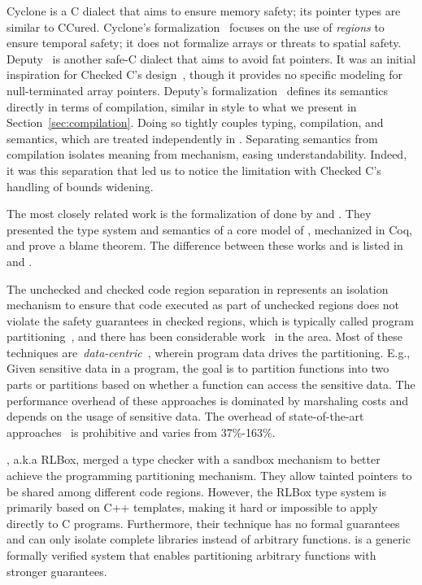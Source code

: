 Cyclone \cite{Jim2002,GrossmanMJHWC02} is a C dialect that aims to
ensure memory safety; its pointer types are similar to
CCured. Cyclone's formalization~\cite{GrossmanMJHWC02} focuses on the
use of \emph{regions} to ensure temporal safety; it does not formalize
arrays or threats to spatial safety. Deputy~\cite{Feng2006,Condit2007}
is another safe-C dialect that aims to avoid fat pointers. It was an
initial inspiration for Checked C's design~\cite{Elliott2018}, though
it provides no specific modeling for null-terminated array
pointers. Deputy's formalization~\cite{Condit2007} defines its
semantics directly in terms of compilation, similar in style to what
we present in Section~\ref{sec:compilation}. Doing so tightly couples
typing, compilation, and semantics, which are treated independently in
\lang. Separating semantics from compilation isolates meaning 
from mechanism, easing understandability. Indeed, it was this
separation that led us to notice the 
limitation with Checked C's handling of bounds widening.

The most closely related work is the
formalization of \checkedc done by \citet{ruef18checkedc-incr} and \citet{li22checkedc}. They
presented the type system and semantics of a core model of \checkedc,
mechanized in Coq, and prove a blame theorem. 
The difference between these works and \systemname is listed in  and .

%
The unchecked and checked code region separation in \systemname represents an isolation mechanism to ensure that code executed as part of unchecked regions does not violate the safety guarantees in checked regions,
which is typically called program partitioning~\cite{rul2009towards}, and there has been considerable work~\cite{tan2017principles, brumley2004privtrans, bittau2008wedge, lind2017glamdring, liu2017ptrsplit} in the area. Most of these techniques are~\emph{data-centric}~\cite{lind2017glamdring, liu2017ptrsplit}, wherein program data drives the partitioning. E.g., Given sensitive data in a program, the goal is to partition functions into two parts or partitions based on whether a function can access the sensitive data.
The performance overhead of these approaches is dominated by marshaling costs and depends on the usage of sensitive data.
The overhead of state-of-the-art approaches~\cite{lind2017glamdring, liu2017ptrsplit} is prohibitive and varies from 37\%-163\%.

\citet{rlbox-paper}, a.k.a RLBox, merged a type checker with a sandbox mechanism to better achieve the programming partitioning mechanism.
They allow tainted pointers to be shared among different code regions. 
However, the RLBox type system is primarily based on C++ templates, making it hard or impossible to apply directly to C programs.
Furthermore, their technique has no formal guarantees and can only isolate complete libraries instead of arbitrary functions.
\systemname is a generic formally verified system that enables partitioning arbitrary functions with stronger guarantees.

